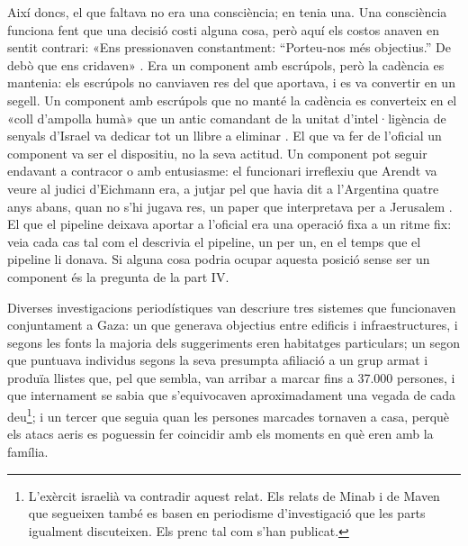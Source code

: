 Així doncs, el que faltava no era una consciència; en tenia una. Una consciència funciona fent que una decisió costi alguna cosa, però aquí els costos anaven en sentit contrari: «Ens pressionaven constantment: “Porteu-nos més objectius.” De debò que ens cridaven» \autocite{abraham2024lavender}. Era un component amb escrúpols, però la cadència es mantenia: els escrúpols no canviaven res del que aportava, i es va convertir en un segell. Un component amb escrúpols que no manté la cadència es converteix en el «coll d'ampolla humà» que un antic comandant de la unitat d'intel·ligència de senyals d'Israel va dedicar tot un llibre a eliminar \autocite{ys2021humanmachine}. El que va fer de l'oficial un component va ser el dispositiu, no la seva actitud. Un component pot seguir endavant a contracor o amb entusiasme: el funcionari irreflexiu que Arendt va veure al judici d'Eichmann \autocite{arendt1963eichmann} era, a jutjar pel que havia dit a l'Argentina quatre anys abans, quan no s'hi jugava res, un paper que interpretava per a Jerusalem \autocite{stangneth2014eichmann}. El que el pipeline deixava aportar a l'oficial era una operació fixa a un ritme fix: veia cada cas tal com el descrivia el pipeline, un per un, en el temps que el pipeline li donava. Si alguna cosa podria ocupar aquesta posició sense ser un component és la pregunta de la part IV.

Diverses investigacions periodístiques van descriure tres sistemes que funcionaven conjuntament a Gaza: un que generava objectius entre edificis i infraestructures, i segons les fonts la majoria dels suggeriments eren habitatges particulars; un segon que puntuava individus segons la seva presumpta afiliació a un grup armat i produïa llistes que, pel que sembla, van arribar a marcar fins a 37.000 persones, i que internament se sabia que s'equivocaven aproximadament una vegada de cada deu\footnote{L'exèrcit israelià va contradir aquest relat. Els relats de Minab i de Maven que segueixen també es basen en periodisme d'investigació que les parts igualment discuteixen. Els prenc tal com s'han publicat.}; i un tercer que seguia quan les persones marcades tornaven a casa, perquè els atacs aeris es poguessin fer coincidir amb els moments en què eren amb la família.


